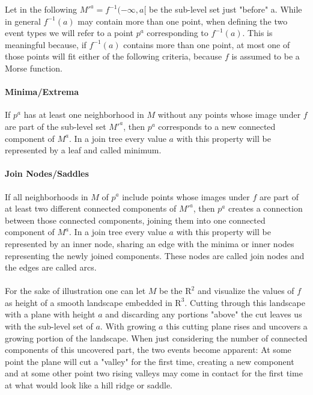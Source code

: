 \documentclass{scrartcl}
\begin{document}
Let in the following \(M'^{a} = f^{-1}(-\infty, a[\) be the sub-level set just "before" a. While in general \(f^{-1}(a)\) may contain more than one point, when defining the two event types we will refer to a point \(p^a\) corresponding to \(f^{-1}(a)\). This is meaningful because, if \(f^{-1}(a)\) contains more than one point, at most one of those points will fit either of the following criteria, because \(f\) is assumed to be a Morse function.
\paragraph{Minima/Extrema} If \(p^a\) has at least one neighborhood in \(M\) without any points whose image under \(f\) are part of the sub-level set \(M'^a\), then \(p^a\) corresponds to a new connected component of \(M^a\). In a join tree every value \(a\) with this property will be represented by a leaf and called minimum.  
\paragraph{Join Nodes/Saddles} If all neighborhoods in \(M\) of \(p^a\) include points whose images under \(f\) are part of at least two different connected components of \(M'^a\), then \(p^a\) creates a connection between those connected components, joining them into one connected component of \(M^a\). In a join tree every value \(a\) with this property will be represented by an inner node, sharing an edge with the minima or inner nodes representing the newly joined components. These nodes are called join nodes and the edges are called arcs.

\paragraph{}For the sake of illustration one can let \(M\) be the $\mathrm{R}^2$ and visualize the values of \(f\) as height of a smooth landscape embedded in $\mathrm{R}^3$. Cutting through this landscape with a plane with height \(a\) and discarding any portions "above" the cut leaves us with the sub-level set of \(a\). With growing \(a\) this cutting plane rises and uncovers a growing portion of the landscape. When just considering the number of connected components of this uncovered part, the two events become apparent: At some point the plane will cut a "valley" for the first time, creating a new component and at some other point two rising valleys may come in contact for the first time at what would look like a hill ridge or saddle.
\end{document}
